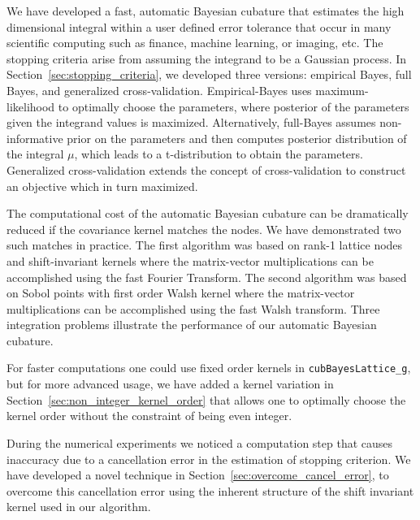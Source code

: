 \documentclass{iitthesis}          %
\newcommand{\code}[1]{\texttt{#1}}
\newcommand\secref{Section~\ref}
\begin{document}
{{{{{{\fi







We have developed a fast, automatic Bayesian cubature that estimates the high dimensional integral within a user defined error tolerance  that occur in many scientific computing such as finance, machine learning, or imaging, etc.  The stopping criteria arise from assuming the integrand to be a Gaussian process.  In \secref{sec:stopping_criteria}, we developed three versions:  empirical Bayes, full Bayes, and generalized cross-validation.  Empirical-Bayes uses maximum-likelihood to optimally choose the parameters, where posterior of the parameters given the integrand values is maximized. Alternatively, full-Bayes assumes non-informative prior on the parameters and then computes posterior distribution of the integral $\mu$, which leads to a t-distribution to obtain the parameters. Generalized cross-validation extends the concept of cross-validation to construct an objective which in turn maximized.

The computational cost of the automatic Bayesian cubature can be dramatically reduced if the covariance kernel matches the nodes.  We have demonstrated two such matches in practice. The first algorithm was based on rank-1 lattice nodes and shift-invariant kernels where the matrix-vector multiplications can be accomplished using the fast Fourier Transform.  The second algorithm was based on Sobol points with first order Walsh kernel where the matrix-vector multiplications can be accomplished using the fast Walsh transform. Three integration problems illustrate the performance of our automatic Bayesian cubature.  

For faster computations one could use fixed order kernels in \code{cubBayesLattice\_g}, but for more advanced usage, we have added a kernel variation in \secref{sec:non_integer_kernel_order} that allows one to optimally choose the kernel order without the constraint of being even integer.

During the numerical experiments we noticed a computation step that causes inaccuracy due to a cancellation error in the estimation of stopping criterion.
We have developed a novel technique in \secref{sec:overcome_cancel_error}, to overcome this cancellation error using the inherent structure of the shift invariant kernel used in our algorithm.

}}}}}}
\end{document}
